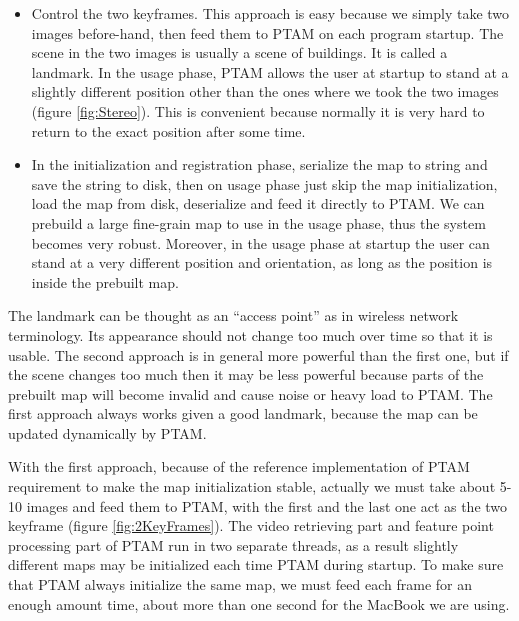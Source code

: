 \begin{itemize}
	\item Control the two keyframes. This approach is easy because we simply take two images before-hand, then feed them to PTAM on each program startup. The scene in the two images is usually a scene of buildings. It is called a landmark. In the usage phase, PTAM allows the user at startup to stand at a slightly different position other than the ones where we took the two images (figure \ref{fig:Stereo}). This is convenient because normally it is very hard to return to the exact position after some time.
	\item In the initialization and registration phase, serialize the map to string and save the string to disk, then on usage phase just skip the map initialization, load the map from disk, deserialize and feed it directly to PTAM. We can prebuild a large fine-grain map to use in the usage phase, thus the system becomes very robust. Moreover, in the usage phase at startup the user can stand at a very different position and orientation, as long as the position is inside the prebuilt map.
\end{itemize}

The landmark can be thought as an ``access point'' as in wireless network terminology. Its appearance should not change too much over time so that it is usable. The second approach is in general more powerful than the first one, but if the scene changes too much then it may be less powerful because parts of the prebuilt map will become invalid and cause noise or heavy load to PTAM. The first approach always works given a good landmark, because the map can be updated dynamically by PTAM.

With the first approach, because of the reference implementation of PTAM requirement to make the map initialization stable, actually we must take about 5-10 images and feed them to PTAM, with the first and the last one act as the two keyframe (figure \ref{fig:2KeyFrames}). The video retrieving part and feature point processing part of PTAM run in two separate threads, as a result slightly different maps may be initialized each time PTAM during startup. To make sure that PTAM always initialize the same map, we must feed each frame for an enough amount time, about more than one second for the MacBook we are using.

